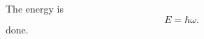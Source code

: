 \documentclass{article}
\begin{document}
The energy is
$$ E = \hbar \omega . $$
done.
\end{document}
